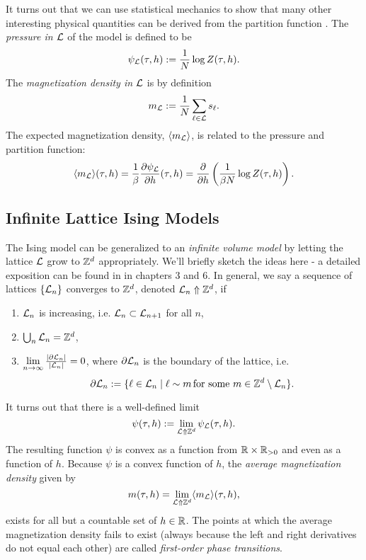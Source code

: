 \documentclass[11pt,reqno]{amsart}
\begin{document}
	It turns out that we can use statistical mechanics to show that many other interesting physical quantities can be derived from the partition function \cite[Ch. 3]{friedli_velenik_2017}.
	The \emph{pressure in $\mathcal{L}$} of the model is defined to be 
	\[\psi_{\mathcal{L}}(\tau,h):=\frac{1}{N} \log Z(\tau,h).  \]
	The \emph{magnetization density in $\mathcal{L}$} is by definition 
	\[ m_{\mathcal{L}}:=\frac{1}{N}\sum_{\ell \in \mathcal{L}} s_\ell. \]
	The expected magnetization density, $\langle m_{\mathcal{L}} \rangle$, is related to the pressure and partition function:
	\[\langle m_{\mathcal{L}} \rangle (\tau,h) = \frac{1}{\beta}\frac{\partial \psi_{\mathcal{L}}}{\partial h}(\tau, h)=\frac{\partial}{\partial h}\left( \frac{1}{\beta N} \log Z(\tau,h)\right) . \]
	
	
	\subsection{Infinite Lattice Ising Models}
	
	The Ising model can be generalized to an \emph{infinite volume model} by letting the lattice $\mathcal{L}$ grow to $\mathbb{Z}^d$ appropriately. 
	We'll briefly sketch the ideas here - a detailed exposition can be found in \cite{friedli_velenik_2017} in chapters 3 and 6.
	In general, we say a sequence of lattices $\{\mathcal{L}_n \}$ converges to $\mathbb{Z}^d$, denoted $\mathcal{L}_n \Uparrow \mathbb{Z}^d$, if 
	\begin{enumerate}
		\item $\mathcal{L}_n$ is increasing, i.e. $\mathcal{L}_n \subset \mathcal{L}_{n+1}$ for all $n$,
		\item $\bigcup_{n} \mathcal{L}_n = \mathbb{Z}^d$,
		\item $\lim\limits_{n\to \infty} \frac{|\partial \mathcal{L}_n|}{|\mathcal{L}_n|}=0$, where $\partial \mathcal{L}_n$ is the boundary of the lattice, i.e. 
		\[\partial \mathcal{L}_n := \{\ell \in \mathcal{L}_n \mid \ell \sim m \, \text{for some $m$}\in \mathbb{Z}^d \setminus \mathcal{L}_n \}. \]
	\end{enumerate}
	It turns out that there is a well-defined limit 
		\[\psi(\tau,h):= \lim\limits_{\mathcal{L} \Uparrow \mathbb{Z}^d} \psi_{\mathcal{L}}(\tau,h).\]
	The resulting function $\psi$ is convex as a function from $\mathbb{R} \times \mathbb{R}_{>0}$ and even as a function of $h$.
	Because $\psi$ is a convex function of $h$, the \emph{average magnetization density} given by
		\[m(\tau,h)=\lim_{\mathcal{L} \Uparrow \mathbb{Z}^d} \langle m_{\mathcal{L}} \rangle (\tau, h), \]
	exists for all but a countable set of $h \in \mathbb{R}$.
	The points at which the average magnetization density fails to exist (always because the left and right derivatives do not equal each other) are called \emph{first-order phase transitions}.
		
\end{document}

